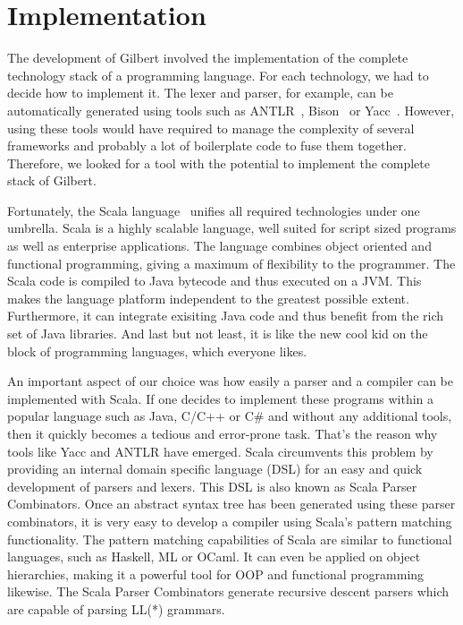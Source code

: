 \chapter{Implementation}
\label{cha:implementation}


The development of Gilbert involved the implementation of the complete technology stack of a programming language.
For each technology, we had to decide how to implement it.
The lexer and parser, for example, can be automatically generated using tools such as ANTLR~\cite{antlr}, Bison~\cite{bison} or Yacc~\cite{yacc}.
However, using these tools would have required to manage the complexity of several frameworks and probably a lot of boilerplate code to fuse them together.
Therefore, we looked for a tool with the potential to implement the complete stack of Gilbert.

Fortunately, the Scala language~\cite{scala,odersky:2010a} unifies all required technologies under one umbrella.
Scala is a highly scalable language, well suited for script sized programs as well as enterprise applications.
The language combines object oriented and functional programming, giving a maximum of flexibility to the programmer.
The Scala code is compiled to Java bytecode and thus executed on a JVM.
This makes the language platform independent to the greatest possible extent.
Furthermore, it can integrate exisiting Java code and thus benefit from the rich set of Java libraries.
And last but not least, it is like the new cool kid on the block of programming languages, which everyone likes.

An important aspect of our choice was how easily a parser and a compiler can be implemented with Scala.
If one decides to implement these programs within a popular language such as Java, C/C++ or C\# and without any additional tools, then it quickly becomes a tedious and error-prone task.
That's the reason why tools like Yacc and ANTLR have emerged.
Scala circumvents this problem by providing an internal domain specific language (DSL) for an easy and quick development of parsers and lexers.
This DSL is also known as Scala Parser Combinators.
Once an abstract syntax tree has been generated using these parser combinators, it is very easy to develop a compiler using Scala's pattern matching functionality.
The pattern matching capabilities of Scala are similar to functional languages, such as Haskell, ML or OCaml.
It can even be applied on object hierarchies, making it a powerful tool for OOP and functional programming likewise.
The Scala Parser Combinators generate recursive descent parsers which are capable of parsing LL(*) grammars.

